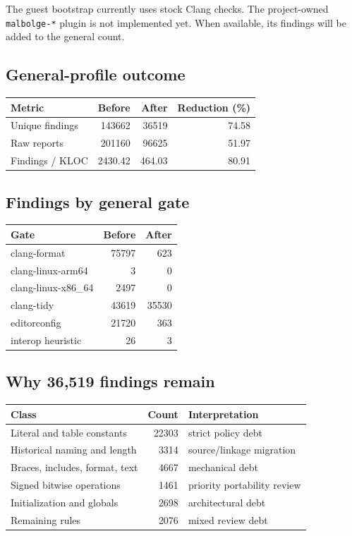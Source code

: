 \documentclass[11pt]{article}
\begin{document}
The guest bootstrap currently uses stock Clang checks. The project-owned
\texttt{malbolge-*} plugin is not implemented yet. When available, its findings
will be added to the general count.

\subsection*{General-profile outcome}
\begin{tabular}{lrrr}
\toprule
Metric & Before & After & Reduction (\%) \\
\midrule
Unique findings & 143662 & 36519 & 74.58 \\
Raw reports & 201160 & 96625 & 51.97 \\
Findings / KLOC & 2430.42 & 464.03 & 80.91 \\
\bottomrule
\end{tabular}

\subsection*{Findings by general gate}
\begin{tabular}{lrr}
\toprule
Gate & Before & After \\
\midrule
clang-format & 75797 & 623 \\
clang-linux-arm64 & 3 & 0 \\
clang-linux-x86\_64 & 2497 & 0 \\
clang-tidy & 43619 & 35530 \\
editorconfig & 21720 & 363 \\
interop heuristic & 26 & 3 \\
\bottomrule
\end{tabular}

\subsection*{Why 36,519 findings remain}
\begin{tabular}{lrl}
\toprule
Class & Count & Interpretation \\
\midrule
Literal and table constants & 22303 & strict policy debt \\
Historical naming and length & 3314 & source/linkage migration \\
Braces, includes, format, text & 4667 & mechanical debt \\
Signed bitwise operations & 1461 & priority portability review \\
Initialization and globals & 2698 & architectural debt \\
Remaining rules & 2076 & mixed review debt \\
\bottomrule
\end{tabular}
\end{document}
